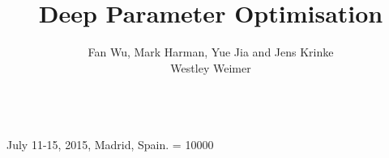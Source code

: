 \documentclass{sig-alternate}
\begin{document}
  {July 11-15, 2015, Madrid, Spain.}
    \widowpenalty = 10000

\title{Deep Parameter Optimisation}

\author{
\alignauthor Fan Wu, Mark Harman, Yue Jia and Jens Krinke\\
\alignauthor Westley Weimer\\
       \\
}

%

\end{document}
